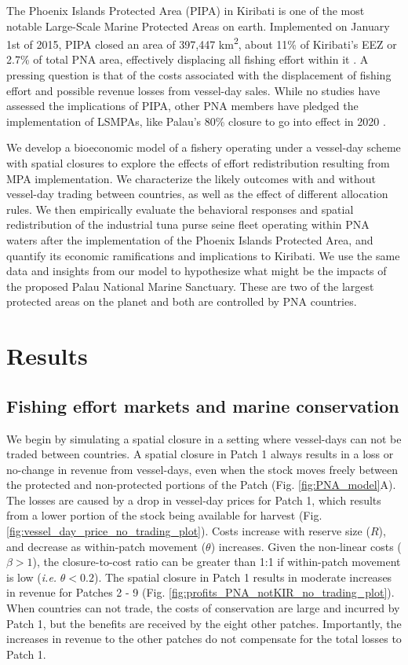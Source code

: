 \documentclass[12pt]{article}
\begin{document}
The Phoenix Islands Protected Area (PIPA) in Kiribati is one of the most notable Large-Scale Marine Protected Areas on earth. Implemented on January 1st of 2015, PIPA closed an area of 397,447 km\textsuperscript{2}, about 11\% of Kiribati's EEZ or 2.7\% of total PNA area, effectively displacing all fishing effort within it \cite{mcdermott_2018,mccauley_2016}. A pressing question is that of the costs associated with the displacement of fishing effort and possible revenue losses from vessel-day sales. While no studies have assessed the implications of PIPA, other PNA members have pledged the implementation of LSMPAs, like Palau's 80\% closure to go into effect in 2020 \cite{cimino_2019}.

We develop a bioeconomic model of a fishery operating under a vessel-day scheme with spatial closures to explore the effects of effort redistribution resulting from MPA implementation. We characterize the likely outcomes with and without vessel-day trading between countries, as well as the effect of different allocation rules. We then empirically evaluate the behavioral responses and spatial redistribution of the industrial tuna purse seine fleet operating within PNA waters after the implementation of the Phoenix Islands Protected Area, and quantify its economic ramifications and implications to Kiribati. We use the same data and insights from our model to hypothesize what might be the impacts of the proposed Palau National Marine Sanctuary. These are two of the largest protected areas on the planet and both are controlled by PNA countries.

\section{Results}\label{results}

\subsection{Fishing effort markets and marine conservation}

We begin by simulating a spatial closure in a setting where vessel-days can not be traded between countries. A spatial closure in Patch 1 always results in a loss or no-change in revenue from vessel-days, even when the stock moves freely between the protected and non-protected portions of the Patch (Fig. \ref{fig:PNA_model}A). The losses are caused by a drop in vessel-day prices for Patch 1, which results from a lower portion of the stock being available for harvest (Fig. \ref{fig:vessel_day_price_no_trading_plot}). Costs increase with reserve size ($R$), and decrease as within-patch movement ($\theta$) increases. Given the non-linear costs ($\beta > 1$), the closure-to-cost ratio can be greater than 1:1 if within-patch movement is low (\emph{i.e.} $\theta < 0.2$). The spatial closure in Patch 1 results in moderate increases in revenue for Patches 2 - 9 (Fig. \ref{fig:profits_PNA_notKIR_no_trading_plot}). When countries can not trade, the costs of conservation are large and incurred by Patch 1, but the benefits are received by the eight other patches. Importantly, the increases in revenue to the other patches do not compensate for the total losses to Patch 1.
\end{document}
